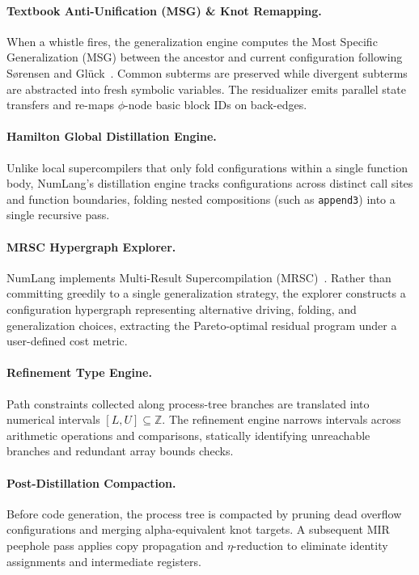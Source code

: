 \paragraph{Textbook Anti-Unification (MSG) \& Knot Remapping.}
When a whistle fires, the generalization engine computes the Most Specific Generalization (MSG) between the ancestor and current configuration following Sørensen and Glück~\cite{sorensen1995algorithm}. Common subterms are preserved while divergent subterms are abstracted into fresh symbolic variables. The residualizer emits parallel state transfers and re-maps $\phi$-node basic block IDs on back-edges.

\paragraph{Hamilton Global Distillation Engine.}
Unlike local supercompilers that only fold configurations within a single function body, NumLang's distillation engine tracks configurations across distinct call sites and function boundaries, folding nested compositions (such as \texttt{append3}) into a single recursive pass.

\paragraph{MRSC Hypergraph Explorer.}
NumLang implements Multi-Result Supercompilation (MRSC)~\cite{klyuchnikov2012practical}. Rather than committing greedily to a single generalization strategy, the explorer constructs a configuration hypergraph representing alternative driving, folding, and generalization choices, extracting the Pareto-optimal residual program under a user-defined cost metric.

\paragraph{Refinement Type Engine.}
Path constraints collected along process-tree branches are translated into numerical intervals $[L, U] \subseteq \mathbb{Z}$. The refinement engine narrows intervals across arithmetic operations and comparisons, statically identifying unreachable branches and redundant array bounds checks.

\paragraph{Post-Distillation Compaction.}
Before code generation, the process tree is compacted by pruning dead overflow configurations and merging alpha-equivalent knot targets. A subsequent MIR peephole pass applies copy propagation and $\eta$-reduction to eliminate identity assignments and intermediate registers.

